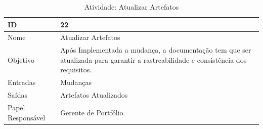 \begin{table}[H]
  \centering
    \begin{tabular}{| m{5em} | m{10cm} |}
      \hline
      ID       & 22   \\ \hline
      Nome     & Atualizar Artefatos  \\ \hline
      Objetivo & Após Implementada a mudança, a documentação tem que ser atualizada para garantir a rastreabilidade e consistência dos requisitos.  \\ \hline
      Entradas & Mudanças\\ \hline
      Saídas   & Artefatos Atualizados  \\ \hline
      Papel Responsável   & Gerente de Portfólio. \\ \hline
    \end{tabular}
    \caption{Atividade: Atualizar Artefatos}
    \label{tabela:atividade22}
\end{table}
